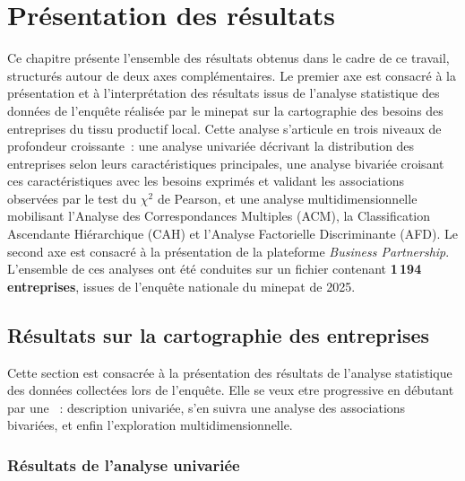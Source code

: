 \documentclass[12pt, a4paper, oneside]{report}
\begin{document}
	\chapter{Présentation des résultats}
	
	Ce chapitre présente l'ensemble des résultats obtenus dans le cadre
	de ce travail, structurés autour de deux axes complémentaires. Le
	premier axe est consacré à la présentation et à l'interprétation des
	résultats issus de l'analyse statistique des données de l'enquête
	réalisée par le \gls{minepat} sur la cartographie des besoins des
	entreprises du tissu productif local. Cette analyse s'articule en
	trois niveaux de profondeur croissante~: une analyse univariée
	décrivant la distribution des entreprises selon leurs caractéristiques
	principales, une analyse bivariée croisant ces caractéristiques avec
	les besoins exprimés et validant les associations observées par le
	test du $\chi^2$ de Pearson, et une analyse multidimensionnelle
	mobilisant l'Analyse des Correspondances Multiples (ACM), la
	Classification Ascendante Hiérarchique (CAH) et l'Analyse Factorielle
	Discriminante (AFD). Le second axe est consacré à la présentation de
	la plateforme \textit{Business Partnership}. L'ensemble de ces
	analyses ont été conduites sur un fichier contenant
	\textbf{1\,194 entreprises}, issues de l'enquête nationale du
	\gls{minepat} de 2025.
	
	\section{Résultats sur la cartographie des entreprises}
	\label{sec:resultats_carto}
	
	Cette section est consacrée à la présentation des résultats de l'analyse statistique des
	données collectées lors de l'enquête. Elle se veux etre progressive en débutant par une ~: description
	univariée, s'en suivra une analyse des associations bivariées, et enfin  l'exploration
	multidimensionnelle.
	
	\subsection{Résultats de l'analyse univariée}
	\label{subsec:univariee}
	
\end{document}
